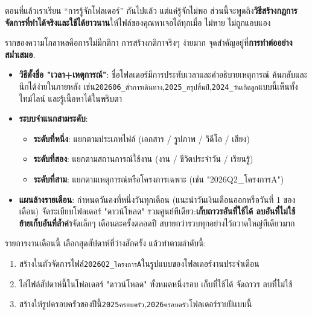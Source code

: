 
ตอนที่แล้วเราเรียน “การรู้จักโฟลเดอร์” กันไปแล้ว แต่แค่รู้จักไม่พอ ส่วนนี้จะพูดถึง\textbf{วิธีสร้างกฎการจัดการที่ทำได้จริงและใช้ได้ยาวนาน}ให้ไฟล์ของคุณหาเจอได้ทุกเมื่อ ไม่หาย ไม่ถูกแอบแอง


รากของความโกลาหลคือการไม่มีกติกา การสร้างกติกาจริงๆ ง่ายมาก จุดสำคัญอยู่ที่\textbf{การทำต่ออย่างสม่ำเสมอ}.

\begin{itemize}
  \item \textbf{วิธีตั้งชื่อ "เวลา+เหตุการณ์"}: ชื่อโฟลเดอร์มีการประทับเวลาและคำอธิบายเหตุการณ์ ค้นกลับและนึกได้ง่ายในภายหลัง เช่น\texttt{202606\_ตั๋วการเดินทาง},\texttt{2025\_สรุปสิ้นปี},\texttt{2024\_วันเกิดลูก}แบบนี้เห็นทั้งไทม์ไลน์ และรู้เนื้อหาได้ในพริบตา
  \item \textbf{ระบบจำแนกสามระดับ}:
  \begin{itemize}
    \item \textbf{ระดับที่หนึ่ง}: แยกตามประเภทไฟล์ (เอกสาร / รูปภาพ / วิดีโอ / เสียง)
    \item \textbf{ระดับที่สอง}: แยกตามสถานการณ์ใช้งาน (งาน / ชีวิตประจำวัน / เรียนรู้)
    \item \textbf{ระดับที่สาม}: แยกตามเหตุการณ์หรือโครงการเฉพาะ (เช่น "2026Q2\_โครงการA")
  \end{itemize}
  \item \textbf{แผนล้างรายเดือน}: กำหนดวันคงที่หนึ่งวันทุกเดือน (แนะนำวันเงินเดือนออกหรือวันที่ 1 ของเดือน) จัดระเบียบโฟลเดอร์ "ดาวน์โหลด" รวมศูนย์ทีเดียว:\textbf{เก็บถาวรอันที่ใช้ได้ ลบอันที่ไม่ใช้ ย้ายเก็บอันที่ล้ำค่า}จัดเล็กๆ เดือนละครั้งตลอดปี สบายกว่ารวบทุกอย่างไว้กวาดใหญ่ทีเดียวมาก
\end{itemize}

\begin{tcbpractice}{รายการงานเดือนนี้}
เลือกสุดสัปดาห์ที่ว่างสักครั้ง แล้วทำตามลำดับนี้:

\begin{enumerate}
  \item สร้างในตัวจัดการไฟล์\texttt{2026Q2\_โครงการA}ในรูปแบบของโฟลเดอร์งานประจำเดือน
  \item ไล่ไฟล์สัปดาห์นี้ในโฟลเดอร์ "ดาวน์โหลด" ทั้งหมดหนึ่งรอบ เก็บที่ใช้ได้ จัดถาวร ลบที่ไม่ใช้
  \item สร้างให้รูปครอบครัวของปีนี้\texttt{2025ครอบครัว},\texttt{2026ครอบครัว}โฟลเดอร์รายปีแบบนี้
\end{enumerate}

\end{tcbpractice}

